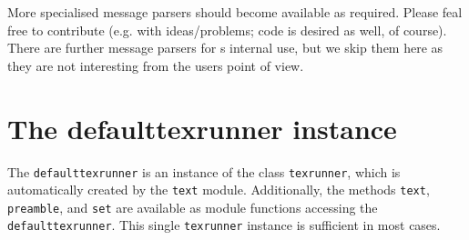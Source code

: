 More specialised message parsers should become available as required.
Please feal free to contribute (e.g. with ideas/problems; code is
desired as well, of course). There are further message parsers for
\PyX{}s internal use, but we skip them here as they are not
interesting from the users point of view.

\section{The defaulttexrunner instance}
The \verb|defaulttexrunner| is an instance of the class
\verb|texrunner|, which is automatically created by the \verb|text|
module. Additionally, the methods \verb|text|, \verb|preamble|, and
\verb|set| are available as module functions accessing the
\verb|defaulttexrunner|. This single \verb|texrunner| instance is
sufficient in most cases.

